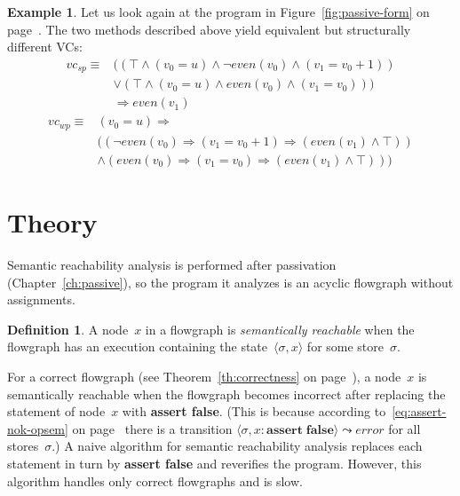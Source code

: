 \documentclass[a4paper]{article}
\newcommand{\limp}{\Rightarrow}
\newcommand{\tru}{\top}
\theoremstyle{slanted}
\theoremstyle{definition}
\newtheorem{definition}{Definition}
\newtheorem{example}{Example}
\theoremstyle{remark}
\begin{document}
\begin{example}
Let us look again at the program in Figure~\ref{fig:passive-form}
on page~\pageref{fig:passive-form}. The two methods described
above yield equivalent but structurally different VCs:
\begin{equation}
\begin{split}
\mathit{vc}_\mathit{sp} \equiv
  &\big((\tru\land(v_0=u)\land\lnot\mathit{even}(v_0)\land(v_1=v_0+1))\\
  &\lor(\tru\land(v_0=u)\land\mathit{even}(v_0)\land(v_1=v_0))\big)\\
  &\limp\mathit{even}(v_1)
\end{split}\label{eq:vcsp}
\end{equation}
\begin{equation}
\begin{split}
\mathit{vc}_\mathit{wp} \equiv
  &(v_0=u)\limp\\
  &\big((\lnot\mathit{even}(v_0)\limp(v_1=v_0+1)\limp(\mathit{even}(v_1)\land\tru))\\
  &\land(\mathit{even}(v_0)\limp(v_1=v_0)\limp(\mathit{even}(v_1)\land\tru))\big)
\end{split}
\end{equation}
\end{example}
\section{Theory}
\label{sec:ra.theory}

Semantic reachability analysis is performed after passivation
(Chapter~\ref{ch:passive}), so the program it analyzes is an
acyclic flowgraph without assignments.

\begin{definition}
A node~$x$ in a flowgraph is \emph{semantically reachable}
when the flowgraph has an execution containing the
state~$\langle\sigma,x\rangle$ for some store~$\sigma$.
\end{definition}

For a correct flowgraph (see Theorem~\ref{th:correctness} on
page~\pageref{th:correctness}), a node~$x$ is semantically
reachable when the flowgraph becomes incorrect after replacing
the statement of node~$x$ with \textbf{assert false}. (This
is because according to~\eqref{eq:assert-nok-opsem} on
page~\pageref{eq:assert-nok-opsem} there is a transition
$\langle\sigma,x:\mathbf{assert}\;\mathbf{false}\rangle\leadsto
\mathit{error}$ for all stores~$\sigma$.) A naive algorithm for
semantic reachability analysis replaces each statement in turn by
\textbf{assert false} and reverifies the program. However, this
algorithm handles only correct flowgraphs and is slow.
\end{document}
